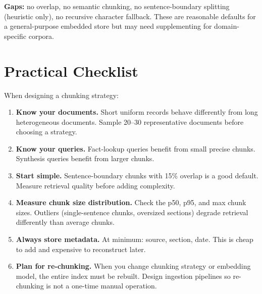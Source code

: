 \textbf{Gaps:} no overlap, no semantic chunking, no sentence-boundary splitting (heuristic
only), no recursive character fallback. These are reasonable defaults for a general-purpose
embedded store but may need supplementing for domain-specific corpora.

\section{Practical Checklist}

When designing a chunking strategy:

\begin{enumerate}
    \item \textbf{Know your documents.} Short uniform records behave differently from long
          heterogeneous documents. Sample 20--30 representative documents before choosing
          a strategy.

    \item \textbf{Know your queries.} Fact-lookup queries benefit from small precise chunks.
          Synthesis queries benefit from larger chunks.

    \item \textbf{Start simple.} Sentence-boundary chunks with 15\% overlap is a good default.
          Measure retrieval quality before adding complexity.

    \item \textbf{Measure chunk size distribution.} Check the p50, p95, and max chunk sizes.
          Outliers (single-sentence chunks, oversized sections) degrade retrieval differently
          than average chunks.

    \item \textbf{Always store metadata.} At minimum: source, section, date. This is cheap to
          add and expensive to reconstruct later.

    \item \textbf{Plan for re-chunking.} When you change chunking strategy or embedding model,
          the entire index must be rebuilt. Design ingestion pipelines so re-chunking is not a
          one-time manual operation.
\end{enumerate}
